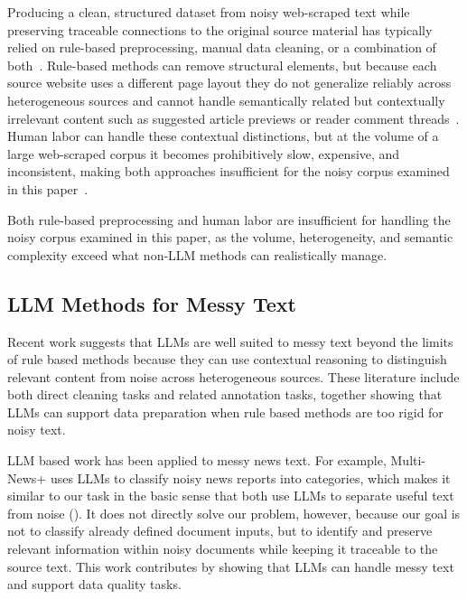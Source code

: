 \documentclass{article}
\begin{document}
Producing a clean, structured dataset from noisy web-scraped text while preserving traceable connections to the original source material has typically relied on rule-based preprocessing, manual data cleaning, or a combination of both~\cite{Bohannon_etal2007,OpenRefine2025}. Rule-based methods can remove structural elements, but because each source website uses a different page layout they do not generalize reliably across heterogeneous sources and cannot handle semantically related but contextually irrelevant content such as suggested article previews or reader comment threads~\cite{Rahm2011,Ma_etal2025}. Human labor can handle these contextual distinctions, but at the volume of a large web-scraped corpus it becomes prohibitively slow, expensive, and inconsistent, making both approaches insufficient for the noisy corpus examined in this paper~\cite{Ma_etal2025,Ni_etal2024}.

Both rule-based preprocessing and human labor are insufficient for handling the noisy corpus examined in this paper, as the volume, heterogeneity, and semantic complexity exceed what non-LLM methods can realistically manage.

\subsection{LLM Methods for Messy
Text}\label{llm-methods-for-messy-text}


Recent work suggests that LLMs are well suited to messy text beyond the limits of rule based methods because they can use contextual reasoning to distinguish relevant content from noise across heterogeneous sources. These literature include both direct cleaning tasks and related annotation tasks, together showing that LLMs can support data preparation when rule based methods are too rigid for noisy text.

LLM based work has been applied to messy news text. For example, Multi-News+ uses LLMs to classify noisy news reports into categories, which makes it similar to our task in the basic sense that both use LLMs to separate useful text from noise (\cite{Choi_etal2024}). It does not directly solve our problem, however, because our goal is not to classify already defined document inputs, but to identify and preserve relevant information within noisy documents while keeping it traceable to the source text. This work contributes by showing that LLMs can handle messy text and support data quality tasks.
\end{document}
